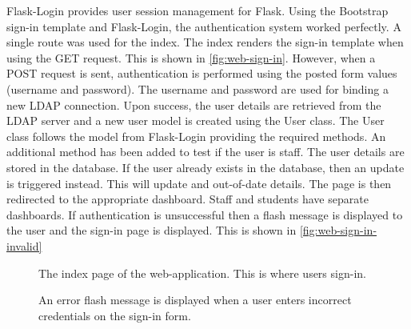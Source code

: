 Flask-Login provides user session management for Flask. Using the Bootstrap sign-in template\cite{BootstrapSignInTemplate} and Flask-Login, the authentication system worked perfectly. A single route was used for the index. The index renders the sign-in template when using the GET request. This is shown in \autoref{fig:web-sign-in}. However, when a POST request is sent, authentication is performed using the posted form values (username and password). The username and password are used for binding a new LDAP connection. Upon success, the user details are retrieved from the LDAP server and a new user model is created using the User class. The User class follows the model from Flask-Login providing the required methods. An additional method has been added to test if the user is staff. The user details are stored in the database. If the user already exists in the database, then an update is triggered instead. This will update and out-of-date details. The page is then redirected to the appropriate dashboard. Staff and students have separate dashboards. If authentication is unsuccessful then a flash message is displayed to the user and the sign-in page is displayed. This is shown in \autoref{fig:web-sign-in-invalid}

\begin{figure}[H]
  \centering
  \caption[Web Sign-in Page]{The index page of the web-application. This is where users sign-in.}
  \label{fig:web-sign-in}
\end{figure}

\begin{figure}[H]
  \centering
  \caption[Web Invalid Sign-in Flash]{An error flash message is displayed when a user enters incorrect credentials on the sign-in form.}
  \label{fig:web-sign-in-invalid}
\end{figure}

